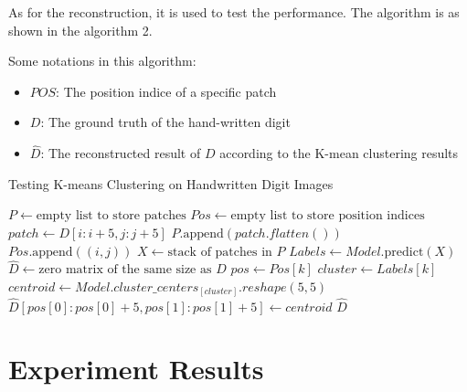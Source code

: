 \documentclass{article}
\begin{document}
As for the reconstruction, it is used to test the performance. The algorithm is as shown in the algorithm 2.

\vspace{2mm}

Some notations in this algorithm:

\begin{itemize}
    \item $POS$: The position indice of a specific patch
    \item $D$: The ground truth of the hand-written digit 
    \item $\hat{D}$: The reconstructed result of $D$ according to the K-mean clustering results
\end{itemize}


\begin{algorithm}
\caption{Testing K-means Clustering on Handwritten Digit Images}
\begin{algorithmic}[1]
    \State $P \gets \text{empty list to store patches}$
    \State $Pos \gets \text{empty list to store position indices}$
     
            \State $patch \gets D[i:i+5, j:j+5]$
                \State $P.\text{append}(patch.flatten())$
                \State $Pos.\text{append}((i, j))$
            \EndIf
        \EndFor
    \EndFor
    \State $X \gets \text{stack of patches in } P$
    \State $Labels \gets Model.\text{predict}(X)$ 
    \State $\hat{D} \gets \text{zero matrix of the same size as } D$ 
        \State $pos \gets Pos[k]$
        \State $cluster \gets Labels[k]$
        \State $centroid \gets Model.cluster\_centers_[cluster].reshape(5, 5)$
        \State $\hat{D}[pos[0]:pos[0]+5, pos[1]:pos[1]+5] \gets centroid$
    \EndFor
    \State \Return $\hat{D}$
\EndProcedure
\end{algorithmic}
\end{algorithm}


\clearpage

\section{Experiment Results}

\end{document}
